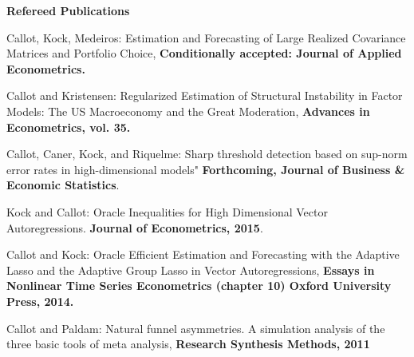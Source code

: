\documentclass[10pt]{article}
\newenvironment{outerlist}[1][\enskip\textbullet]%
        {\begin{itemize}[#1]}{\end{itemize}%
         \vspace{-.1\baselineskip}}
\newenvironment{innerlist}[1][\enskip\textbullet]%
        {\begin{compactitem}[#1]}{\end{compactitem}}
\begin{document}
\begin{outerlist}
\item[] \textbf{Refereed Publications}\\
    \begin{innerlist}
\item[]Callot, Kock, Medeiros: {Estimation and Forecasting of Large Realized Covariance Matrices and Portfolio Choice}, \textbf{Conditionally accepted: Journal of Applied Econometrics.}
\item[Callot and Kristensen:] {Regularized Estimation of Structural Instability in Factor Models: The US Macroeconomy and the Great Moderation}, \textbf{Advances in Econometrics, vol. 35.}
\item[Callot, Caner, Kock, and Riquelme:] Sharp threshold detection based on sup-norm error rates in high-dimensional models" \textbf{Forthcoming, Journal of Business \& Economic Statistics}.
\item[Kock and Callot:] {Oracle Inequalities for High Dimensional Vector Autoregressions}. \textbf{Journal of Econometrics, 2015}.
\item[Callot and Kock:] {Oracle Efficient Estimation and Forecasting with the Adaptive Lasso and the Adaptive Group Lasso in Vector Autoregressions}, \textbf{Essays in Nonlinear Time Series Econometrics (chapter 10) Oxford University Press, 2014.}
\item[Callot and Paldam:] {Natural funnel asymmetries. A simulation analysis of the three basic tools of meta analysis}, \textbf{Research Synthesis Methods, 2011}
    \end{innerlist}


\end{outerlist}
\end{document}

